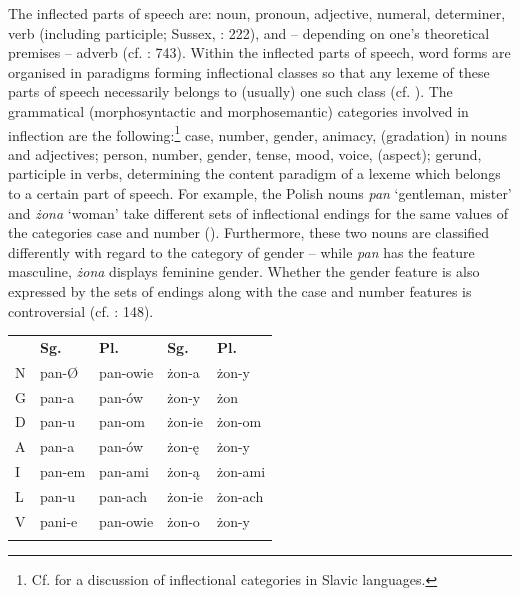 \documentclass[output=paper]{langscibook}
\begin{document}
The inflected parts of speech are: noun, pronoun, adjective, numeral, determiner, verb (including participle; Sussex, \citealt{Cubberley2006}: 222), and – depending on one’s theoretical premises – adverb (cf. \citealt{Nagórko2009}: 743). Within the inflected parts of speech, word forms are organised in paradigms forming inflectional classes so that any lexeme of these parts of speech necessarily belongs to (usually) one such class (cf. ). The grammatical (morphosyntactic and morphosemantic) categories involved in inflection are the following:\footnote{ \textrm{Cf. \citet{SpencerWiemer2020} for a discussion of inflectional categories in Slavic languages.}} case, number, gender, animacy, (gradation) in nouns and adjectives; person, number, gender, tense, mood, voice, (aspect); gerund, participle in verbs, determining the content paradigm of a lexeme which belongs to a certain part of speech. For example, the Polish nouns \textit{pan} ‘gentleman, mister’ and \textit{żona} ‘woman’ take different sets of inflectional endings for the same values of the categories case and number (). Furthermore, these two nouns are classified differently with regard to the category of gender – while \textit{pan} has the feature masculine, \textit{żona} displays feminine gender. Whether the gender feature is also expressed by the sets of endings along with the case and number features is controversial (cf. \citealt{Doleschal2009}: 148). 


\begin{tabularx}{\textwidth}{XXXXX}
 & {\bfseries Sg.} & {\bfseries Pl.} & {\bfseries Sg.} & {\bfseries Pl.}\\
\lsptoprule
N & pan-Ø & pan-owie & żon-a & żon-y\\
G & pan-a & pan-ów & żon-y & żon\\
D & pan-u & pan-om & żon-ie & żon-om\\
A & pan-a & pan-ów & żon-ę & żon-y\\
I & pan-em & pan-ami & żon-ą & żon-ami\\
L & pan-u & pan-ach & żon-ie & żon-ach\\
V & pani-e & pan-owie & żon-o & żon-y\\
\lspbottomrule
\end{tabularx}
\begin{table}
\caption{Inflectional classes (Pol.): pan (M) ‚gentleman, mister‘, żona (F)‚woman‘}
\label{tab:key:1}
\end{table}
\end{document}
